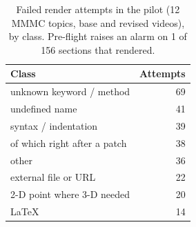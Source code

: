 \begin{table}[t]\centering\small
\caption{Failed render attempts in the pilot (12 MMMC topics, base and revised videos), by class. Pre-flight raises an alarm on 1 of 156 sections that rendered.}\label{tab:failures}
\begin{tabular}{lr}\toprule Class & Attempts\\\midrule
unknown keyword / method & 69 \\
undefined name & 41 \\
syntax / indentation & 39 \\
\quad of which right after a patch & 38 \\
other & 36 \\
external file or URL & 22 \\
2-D point where 3-D needed & 20 \\
LaTeX & 14 \\
\bottomrule\end{tabular}
\end{table}
